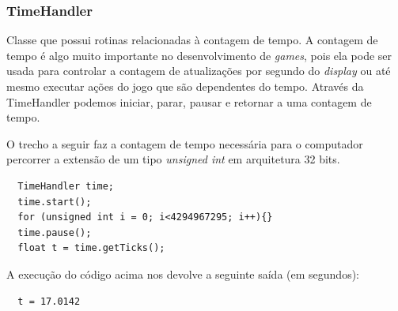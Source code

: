 \subsubsection{TimeHandler}
%
%
Classe que possui rotinas relacionadas à contagem de tempo. A contagem de tempo é algo muito importante no desenvolvimento de \textit{games}, pois ela pode ser usada para controlar a contagem de atualizações por segundo do \textit{display} ou até mesmo executar ações do jogo que são dependentes do tempo. Através da TimeHandler podemos iniciar, parar, pausar e retornar a uma contagem de tempo. 

O trecho a seguir faz a contagem de tempo necessária para o computador percorrer a extensão de um tipo \textit{unsigned int} em arquitetura 32 bits.
%
\begin{lstlisting}
  TimeHandler time;
  time.start();
  for (unsigned int i = 0; i<4294967295; i++){} 
  time.pause();
  float t = time.getTicks();
\end{lstlisting}
%
\par 
A execução do código acima nos devolve a seguinte saída (em segundos): 
%
\begin{lstlisting}
  t = 17.0142
\end{lstlisting}
%
